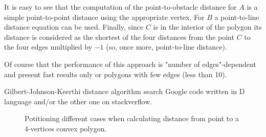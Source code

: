 It is easy to see that the computation of the point-to-obstacle distance for $A$ is a simple point-to-point distance
using the appropriate vertex. For $B$ a point-to-line distance equation can be used. Finally, since $C$ is in the
interior of the polygon its distance is considered as the shortest of the four distances from the point $C$ to the
four edges multiplied by $-1$ (so, once more, point-to-line distance).

Of course that the performance of this approach is "number of edges"-dependent and present fast results only or 
polygons with few edges (less than 10). 

Gilbert-Johnson-Keerthi distance algorithm search Google code written in D language and/or the other one on stackverflow.

\begin{figure}[!h]
\centering
{}
\caption{Potitioning different cases when calculating distance from point to a 4-vertices convex polygon. \label{fig:convexpolygon}}
\end{figure}

